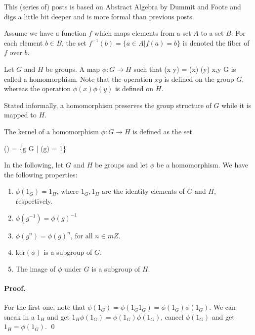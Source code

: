 
This (series of) posts is based on Abstract Algebra by Dummit and Foote and digs a little bit deeper and is more formal than previous posts.

\begin{definition}[Fibers]
Assume we have a function $f$ which maps elements from a set $A$ to a set $B$. For each element $b \in B$, the set $f^{-1}(b) = \{a \in A | f(a) = b\}$ is denoted the fiber of $f$ over $b$.
\end{definition}


\begin{definition}[Homomorphism]
Let $G$ and $H$ be groups. A map $\phi: G \rightarrow H$ such that
\bee
\phi(x y) = \phi(x) \phi(y) \quad \forall x,y \in G
\eee
is called a homomorphism. Note that the operation $xy$ is defined on the group $G$, whereas the operation $\phi(x) \phi(y)$ is defined on $H$.
\end{definition}

Stated informally, a homomorphism preserves the group structure of $G$ while it is mapped to $H$.

\begin{definition}[Kernel]
The kernel of a homomorphism $\phi: G \rightarrow H$ is defined as the set

\bee
{}(\phi) = \{g \in G | \phi(g) = 1\}
\eee
\end{definition}

In the following, let $G$ and $H$ be groups and let $\phi$ be a homomorphism. We have the following properties:

\begin{enumerate}

\item $\phi(1_G) = 1_H$, where $1_G, 1_H$ are the identity elements of $G$ and $H$, respectively.

\item $\phi(g^{-1}) = \phi(g)^{-1}$

\item $\phi(g^n) = \phi(g)^n$, for all $n \in mZ$.

\item $\text{ker}(\phi)$ is a subgroup of $G$.

\item The image of $\phi$ under $G$ is a subgroup of $H$.

\end{enumerate}

\paragraph{Proof.} For the first one, note that $\phi(1_G) =\phi(1_G 1_G) = \phi(1_G) \phi(1_G)$. We can sneak in a $1_H$ and get $1_H \phi(1_G) =  \phi(1_G) \phi(1_G)$, cancel $\phi(1_G)$ and get $1_H = \phi(1_G)$. \qed


